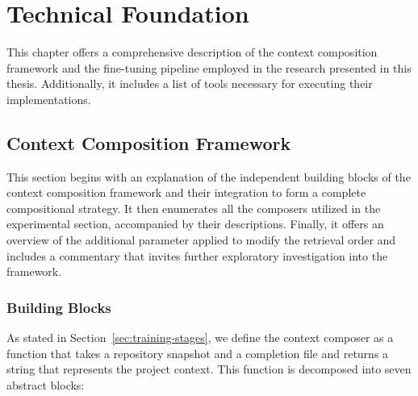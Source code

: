 
\chapter{Technical Foundation}\label{chap:technical-foundation}  %

This chapter offers a comprehensive description of the context composition framework and the fine-tuning pipeline employed in the research presented in this thesis. Additionally, it includes a list of tools necessary for executing their implementations.

\section{Context Composition Framework}

This section begins with an explanation of the independent building blocks of the context composition framework and their integration to form a complete compositional strategy. It then enumerates all the composers utilized in the experimental section, accompanied by their descriptions. Finally, it offers an overview of the additional parameter applied to modify the retrieval order and includes a commentary that invites further exploratory investigation into the framework.

\subsection{Building Blocks}

As stated in Section~\ref{sec:training-stages}, we define the context composer as a function that takes a repository snapshot and a completion file and returns a string that represents the project context. This function is decomposed into seven abstract blocks:

